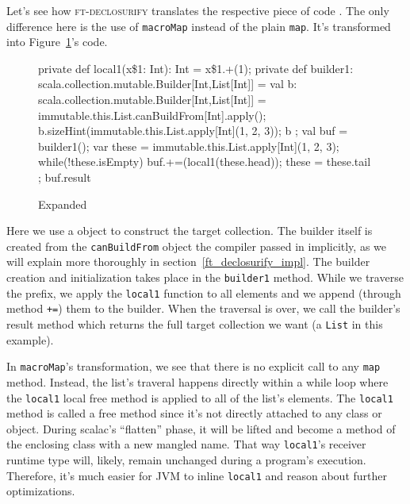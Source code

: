 Let's see how \textsc{ft-declosurify} translates the respective piece of code
. The only difference here is the use of \texttt{macroMap} instead
of the plain \texttt{map}. It's transformed into Figure~\ref{list_expansion_1}'s code.

\begin{figure}
\begin{scalaCode}
{
  private def local1(x\$1: Int): Int = x\$1.+(1);
  private def builder1: scala.collection.mutable.Builder[Int,List[Int]] = {
    val b: scala.collection.mutable.Builder[Int,List[Int]] =
immutable.this.List.canBuildFrom[Int].apply();
    b.sizeHint(immutable.this.List.apply[Int](1, 2, 3));
    b
  };
  val buf = builder1();
  var these = immutable.this.List.apply[Int](1, 2, 3);
  while(!these.isEmpty){
    buf.+=(local1(these.head));
    these = these.tail
  };
  buf.result
}
\end{scalaCode}
\caption[Expanded ]{Expanded }
\label{list_expansion_1}
\end{figure}

Here we use a  object to construct the target
collection. The builder itself is created from the
\texttt{canBuildFrom} object the compiler passed in implicitly, as we will explain more thoroughly in section~\ref{ft_declosurify_impl}. 
The builder creation and initialization takes place in the
\texttt{builder1} method. While we traverse the prefix, we apply the \texttt{local1} function to
all elements and we append (through method \texttt{+=}) them to the builder. When the
traversal is over, we call the builder's result method which returns the full
target collection we want (a \texttt{List} in this example).

In \texttt{macroMap}'s transformation, we see that there is no explicit call to any 
\texttt{map} method. Instead, the list's traveral happens directly within a while loop 
where the \texttt{local1} local free method is applied to all of the list's elements. 
The \texttt{local1} method is called a free method since it's not directly attached to any class or object.
During scalac's ``flatten'' phase, it will be lifted and become a method of
the enclosing class with a new mangled name. That way \texttt{local1}'s receiver runtime type
will, likely, remain unchanged during a program's execution. Therefore, it's much easier for JVM
to inline \texttt{local1} and reason about further optimizations.

